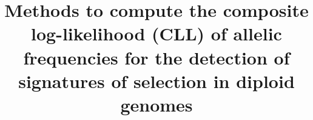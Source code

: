 \documentclass{bmcart}
\begin{document}
\begin{frontmatter}

\begin{fmbox}


\title{Methods to compute the composite log-likelihood (CLL) of allelic
  frequencies for the detection of
  signatures of selection in diploid genomes}


\author[
   addressref={aff1},                   %
   corref={aff1},                       %
   email={filippo.biscarini@tecnoparco.org}   %
]{ }
\author[
   addressref={aff1}, 
   email={nelson.nazzicari@tecnoparco.org}
]{ }
\author[
   addressref={aff1}, 
   email={john.RS.Smith@cambridge.co.uk}
]{ }


\address[id=aff1]{%
  , %
  ,                     %
  ,                              %
}


\end{fmbox}
\end{frontmatter}
\end{document}
